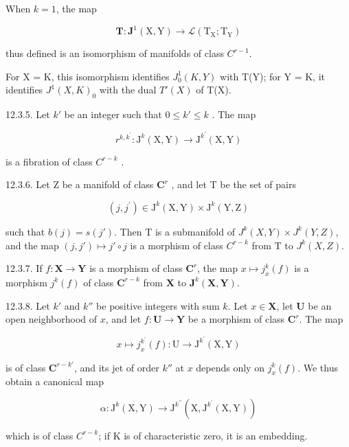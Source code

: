 When \(k = 1\), the map

\[
\mathbf {T} \colon \mathbf {J} ^ {1} (\mathrm{X}, \mathrm{Y}) \rightarrow \mathcal {L} (\mathrm{T} _ {\mathrm{X}}; \mathrm{T} _ {\mathrm{Y}})
\]

thus defined is an isomorphism of manifolds of class \(C^{r-1}\).

For X = K, this isomorphism identifies \(J_{0}^{1}(K, Y)\) with T(Y); for Y = K, it identifies \(J^{1}(X, K)_{0}\) with the dual \(T'(X)\) of T(X).

12.3.5. Let \(k'\) be an integer such that \(0 \leqslant k' \leqslant k\) . The map

\[
r ^ {k, k ^ {\prime}}: \mathrm{J} ^ {k} (\mathrm{X}, \mathrm{Y}) \rightarrow \mathrm{J} ^ {k ^ {\prime}} (\mathrm{X}, \mathrm{Y})\tag{cf. 12.1.5}
\]

is a fibration of class \(C^{r-k}\) .

12.3.6. Let Z be a manifold of class \(\mathbf{C}^r\) , and let T be the set of pairs

\[
(j, j ^ {\prime}) \in \mathrm{J} ^ {k} (\mathrm{X}, \mathrm{Y}) \times \mathrm{J} ^ {k} (\mathrm{Y}, \mathrm{Z})
\]

such that \(b(j) = s(j')\). Then T is a submanifold of \(J^k(X, Y) \times J^k(Y, Z)\), and the map \((j, j') \mapsto j' \circ j\) is a morphism of class \(C^{r-k}\) from T to \(J^k(X, Z)\).

12.3.7. If \(f: \mathbf{X} \to \mathbf{Y}\) is a morphism of class \(\mathbf{C}^r\), the map \(x \mapsto j_x^k(f)\) is a morphism \(j^k(f)\) of class \(\mathbf{C}^{r-k}\) from \(\mathbf{X}\) to \(\mathbf{J}^k(\mathbf{X}, \mathbf{Y})\).

12.3.8. Let \(k'\) and \(k''\) be positive integers with sum \(k\). Let \(x \in \mathbf{X}\), let \(\mathbf{U}\) be an open neighborhood of \(x\), and let \(f: \mathbf{U} \to \mathbf{Y}\) be a morphism of class \(\mathbf{C}^{r}\). The map

\[
x \mapsto j _ {x} ^ {k ^ {\prime}} (f) \colon \mathrm{U} \to \mathrm{J} ^ {k ^ {\prime}} (\mathrm{X}, \mathrm{Y})
\]

is of class \(\mathbf{C}^{r - k'}\), and its jet of order \(k''\) at \(x\) depends only on \(j_x^k (f)\). We thus obtain a canonical map

\[
\alpha \colon \mathrm{J} ^ {k} (\mathrm{X}, \mathrm{Y}) \rightarrow \mathrm{J} ^ {k ^ {\prime \prime}} (\mathrm{X}, \mathrm{J} ^ {k ^ {\prime}} (\mathrm{X}, \mathrm{Y}))
\]

which is of class \(C^{r-k}\); if K is of characteristic zero, it is an embedding.

